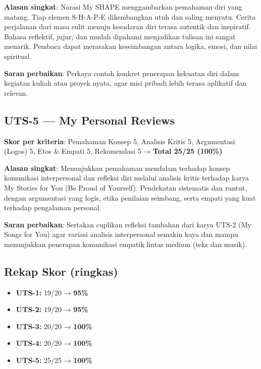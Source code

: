 \documentclass[
  letterpaper,
  DIV=11,
  numbers=noendperiod]{scrreprt}
\providecommand{\tightlist}{%
  \setlength{\itemsep}{0pt}\setlength{\parskip}{0pt}}
\begin{document}
\textbf{Alasan singkat}: Narasi My SHAPE menggambarkan pemahaman diri
yang matang. Tiap elemen S-H-A-P-E dikembangkan utuh dan saling menyatu.
Cerita perjalanan dari masa sulit menuju kesadaran diri terasa autentik
dan inspiratif. Bahasa reflektif, jujur, dan mudah dipahami menjadikan
tulisan ini sangat menarik. Pembaca dapat merasakan keseimbangan antara
logika, emosi, dan nilai spiritual.

\textbf{Saran perbaikan}: Perkaya contoh konkret penerapan kekuatan diri
dalam kegiatan kuliah atau proyek nyata, agar misi pribadi lebih terasa
aplikatif dan relevan.

\subsection{UTS-5 --- My Personal
Reviews}\label{uts-5-my-personal-reviews-1}

\textbf{Skor per kriteria}: Pemahaman Konsep 5, Analisis Kritis 5,
Argumentasi (Logos) 5, Etos \& Empati 5, Rekomendasi 5 → \textbf{Total
25/25 (100\%)}

\textbf{Alasan singkat}: Menunjukkan pemahaman mendalam terhadap konsep
komunikasi interpersonal dan refleksi diri melalui analisis kritis
terhadap karya My Stories for You (Be Proud of Yourself). Pendekatan
sistematis dan runtut, dengan argumentasi yang logis, etika penilaian
seimbang, serta empati yang kuat terhadap pengalaman personal.

\textbf{Saran perbaikan}: Sertakan cuplikan refleksi tambahan dari karya
UTS-2 (My Songs for You) agar variasi analisis interpersonal semakin
kaya dan mampu menunjukkan penerapan komunikasi empatik lintas medium
(teks dan musik).

\subsection{Rekap Skor (ringkas)}\label{rekap-skor-ringkas}

\begin{itemize}
\tightlist
\item
  \textbf{UTS-1:} 19/20 → \textbf{95\%}
\item
  \textbf{UTS-2:} 19/20 → \textbf{95\%}
\item
  \textbf{UTS-3:} 20/20 → \textbf{100\%}
\item
  \textbf{UTS-4:} 20/20 → \textbf{100\%}
\item
  \textbf{UTS-5:} 25/25 → \textbf{100\%}
\end{itemize}
\end{document}
